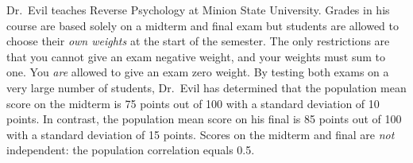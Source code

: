 \documentclass[addpoints,12pt]{exam}
\begin{document}
\begin{questions}



\question Dr.\ Evil teaches Reverse Psychology at Minion State University. Grades in his course are based solely on a midterm and final exam but students are allowed to choose their \emph{own weights} at the start of the semester. 
The only restrictions are that you cannot give an exam negative weight, and your weights must sum to one.
You \emph{are} allowed to give an exam zero weight.
By testing both exams on a very large number of students, Dr.\ Evil has determined that the population mean score on the midterm is 75 points out of 100 with a standard deviation of 10 points.
In contrast, the population mean score on his final is 85 points out of 100 with a standard deviation of 15 points.
Scores on the midterm and final are \emph{not} independent: the population correlation equals 0.5.
\begin{parts}

\end{parts}
\end{questions}
\end{document}
